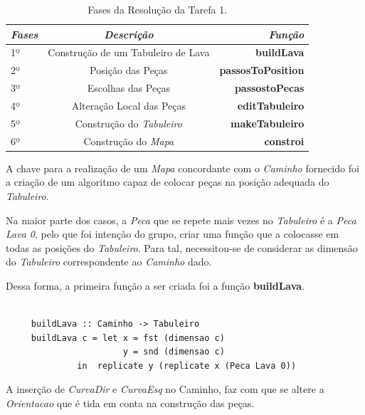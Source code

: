 \documentclass[a4paper]{report} %
\begin{document}
\begin{table}[!h]
\begin{center}
\begin{tabular}{|l|c|r|}
    
    \hline
   \emph{Fases} & \emph{Descrição} & \emph{Função}\\
    \hline
    1º & Construção de um Tabuleiro de Lava & \textbf{buildLava} \\
    \hline
    2º & Posição das Peças & \textbf{passosToPosition} \\
    \hline
    3º & Escolhas das Peças & \textbf{passostoPecas} \\
    \hline
    4º & Alteração Local das Peças & \textbf{editTabuleiro} \\
    \hline
    5º & Construção do \emph{Tabuleiro} & \textbf{makeTabuleiro} \\
    \hline
    6º & Construção do \emph{Mapa} & \textbf{constroi} \\
    \hline
    
\end{tabular}
\end{center}
\caption{Fases da Resolução da Tarefa 1.}
\end{table}
 

 A chave para a realização de um \emph{Mapa} concordante com o \emph{Caminho} fornecido foi a criação de um algoritmo capaz de colocar peças na posição adequada do \emph{Tabuleiro}.
 
 Na maior parte dos casos, a \emph{Peca} que se repete mais vezes no \emph{Tabuleiro} é a \emph{Peca Lava 0}, pelo que foi intenção do grupo, criar uma função que a colocasse em todas as posições do \emph{Tabuleiro}.
 Para tal, necessitou-se de considerar as dimensão do \emph{Tabuleiro} correspondente ao \emph{Caminho} dado.
 
 Dessa forma, a primeira função a ser criada foi a função \textbf{buildLava}.
 
 \begin{verbatim}
     
     buildLava :: Caminho -> Tabuleiro
     buildLava c = let x = fst (dimensao c)
                       y = snd (dimensao c)  
              in  replicate y (replicate x (Peca Lava 0))

 \end{verbatim}

A inserção de \emph{CurvaDir} e \emph{CurvaEsq} no Caminho, faz com que se altere a \emph{Orientacao} que é tida em conta na construção das peças.
\end{document}
